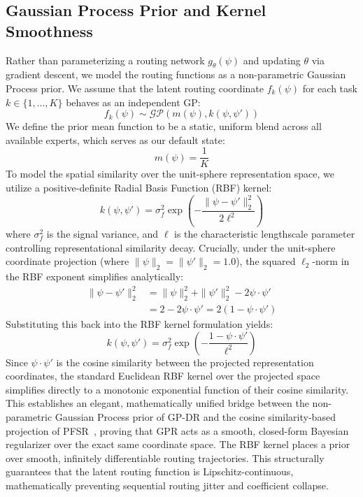 \subsection{Gaussian Process Prior and Kernel Smoothness}
Rather than parameterizing a routing network $g_{\theta}(\psi)$ and updating $\theta$ via gradient descent, we model the routing functions as a non-parametric Gaussian Process prior. We assume that the latent routing coordinate $f_k(\psi)$ for each task $k \in \{1, \dots, K\}$ behaves as an independent GP:
\begin{equation}
f_k(\psi) \sim \mathcal{GP}\left(m(\psi), k(\psi, \psi')\right)
\end{equation}
We define the prior mean function to be a static, uniform blend across all available experts, which serves as our default state:
\begin{equation}
m(\psi) = \frac{1}{K}
\end{equation}
To model the spatial similarity over the unit-sphere representation space, we utilize a positive-definite Radial Basis Function (RBF) kernel:
\begin{equation}
k(\psi, \psi') = \sigma_f^2 \exp\left(-\frac{\|\psi - \psi'\|_2^2}{2 \ell^2}\right)
\end{equation}
where $\sigma_f^2$ is the signal variance, and $\ell$ is the characteristic lengthscale parameter controlling representational similarity decay. Crucially, under the unit-sphere coordinate projection (where $\|\psi\|_2 = \|\psi'\|_2 = 1.0$), the squared $\ell_2$-norm in the RBF exponent simplifies analytically:
\begin{equation}
\begin{aligned}
\|\psi - \psi'\|_2^2 &= \|\psi\|_2^2 + \|\psi'\|_2^2 - 2 \psi \cdot \psi' \\
&= 2 - 2 \psi \cdot \psi' = 2(1 - \psi \cdot \psi')
\end{aligned}
\end{equation}
Substituting this back into the RBF kernel formulation yields:
\begin{equation}
k(\psi, \psi') = \sigma_f^2 \exp\left(-\frac{1 - \psi \cdot \psi'}{\ell^2}\right)
\end{equation}
Since $\psi \cdot \psi'$ is the cosine similarity between the projected representation coordinates, the standard Euclidean RBF kernel over the projected space simplifies directly to a monotonic exponential function of their cosine similarity. This establishes an elegant, mathematically unified bridge between the non-parametric Gaussian Process prior of GP-DR and the cosine similarity-based projection of PFSR~\cite{leland2024pfsr}, proving that GPR acts as a smooth, closed-form Bayesian regularizer over the exact same coordinate space. The RBF kernel places a prior over smooth, infinitely differentiable routing trajectories. This structurally guarantees that the latent routing function is Lipschitz-continuous, mathematically preventing sequential routing jitter and coefficient collapse.

